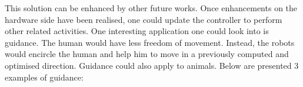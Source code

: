 \documentclass[oneside, a4paper, 12pt]{memoir}
\begin{document}
			This solution can be enhanced by other future works. %
%	
%			
%			
%		
			Once enhancements on the hardware side have been realised, one could update the controller to perform other related activities. One interesting application one could look into is guidance. The human would have less freedom of movement. Instead, the robots would encircle the human and help him to move in a previously computed and optimised direction. Guidance could also apply to animals. Below are presented 3 examples of guidance:
\end{document}

